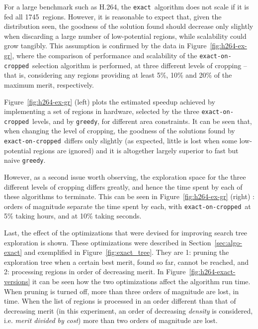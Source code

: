 \documentclass[]{usiinfthesis}
\newcommand{\htsf}{{H.264}}
\newcommand{\exact}{\texttt{exact}}
\newcommand{\greedy}{\texttt{greedy}}
\newcommand{\exactC}{\texttt{exact-on-cropped}}
\newcommand{\numofhtsfregs}{1745} %
\begin{document}
For a large benchmark such as \htsf, the \exact\ algorithm does not
scale if it is fed all \numofhtsfregs\ regions. However, it is reasonable
to expect that, given the distribution seen, the goodness of the
solution found should decrease only slightly when discarding a large
number of low-potential regions, while scalability
could grow tangibly.
This assumption is confirmed by the data in
Figure~\ref{fig:h264-ex-gr}, where the comparison of performance and
scalability of the \exactC\ selection algorithm is performed, at three different
levels of cropping -- that is, considering any regions providing at
least 5\%, 10\% and 20\% of the maximum merit, respectively.\par

Figure~\ref{fig:h264-ex-gr} (left) plots the estimated speedup achieved by
implementing a set of regions in hardware, selected by the three \exactC\
levels, and by \greedy, for different area constraints. It can be seen
that, when changing the level of cropping, the goodness of the
solutions found by \exactC\ differs only slightly (as expected, little
is lost when some low-potential regions are ignored) and it is
altogether largely superior to fast but naive \greedy.\par

However, as a second issue worth observing, the exploration space for
the three different levels of cropping differs greatly, and hence the
time spent by each of these algorithms to terminate. This can be seen
in Figure~\ref{fig:h264-ex-gr} (right) : orders of magnitude separate
the time spent by each, with \exactC\ at 5\% taking hours, and at 10\%
taking seconds.\par

Last, the effect of the optimizations that were devised for
improving search tree exploration is shown. These optimizations were 
described in Section~\ref{sec:algo-exact} and exemplified in
Figure~\ref{fig:exact_tree}. They are 1: pruning the
exploration tree when a certain best merit, found so far, cannot be
reached, and 2: processing regions in order of decreasing merit. In
Figure~\ref{fig:h264-exact-versions} it can be seen how the two
optimizations affect the algorithm run time. When pruning is turned
off, more than three orders of magnitude are lost, in time. When the
list of regions is processed in an order different than that of
decreasing merit (in this experiment, an order of decreasing
\emph{density} is considered, i.e. \emph{merit divided by cost}) more
than two orders of magnitude are lost.
\end{document}
